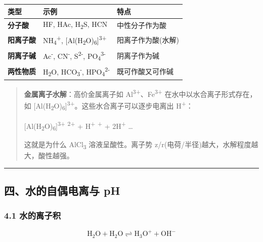 {\def\LTcaptype{none} %
\begin{longtable}[]{@{}lll@{}}
\toprule\noalign{}
类型 & 示例 & 特点 \\
\midrule\noalign{}
\endhead
\bottomrule\noalign{}
\endlastfoot
\textbf{分子酸} & HF, HAc, H\textsubscript{2}S, HCN & 中性分子作为酸 \\
\textbf{阳离子酸} & NH\textsubscript{4}\textsuperscript{+}, {[}Al(H\textsubscript{2}O)\textsubscript{6}{]}\textsuperscript{3+} & 阳离子作为酸(水解) \\
\textbf{阴离子碱} & Ac\textsuperscript{-}, CN\textsuperscript{-}, S\textsuperscript{2-}, PO\textsubscript{4}\textsuperscript{3-} & 阴离子作为碱 \\
\textbf{两性物质} & H\textsubscript{2}O, HCO\textsubscript{3}\textsuperscript{-}, HPO\textsubscript{4}\textsuperscript{2-} & 既可作酸又可作碱 \\
\end{longtable}
}

\begin{quote}
\textbf{金属离子水解}：高价金属离子如 Al\textsuperscript{3+}、Fe\textsuperscript{3+} 在水中以水合离子形式存在，如 {[}Al(H\textsubscript{2}O)\textsubscript{6}{]}\textsuperscript{3+}。这些水合离子可以逐步电离出 H\textsuperscript{+}：

{[}Al(H\textsubscript{2}O)\textsubscript{6}{]}\textsuperscript{3+} \衡 [Al(H~2~O)~5~(OH)]\textsuperscript{2+} + H\textsuperscript{+} \衡 [Al(H~2~O)~4~(OH)~2~]\textsuperscript{+} + 2H\textsuperscript{+} \衡 \ldots{}

这就是为什么 AlCl\textsubscript{3} 溶液呈酸性。离子势 z/r(电荷/半径)越大，水解程度越大，酸性越强。
\end{quote}

\begin{center}\rule{0.5\linewidth}{0.5pt}\end{center}

\subsection{四、水的自偶电离与 pH}\label{ux56dbux6c34ux7684ux81eaux5076ux7535ux79bbux4e0e-ph}

\subsubsection{4.1 水的离子积}\label{ux6c34ux7684ux79bbux5b50ux79ef}

\[
\mathrm{H_2O + H_2O \rightleftharpoons H_3O^+ + OH^-}
\]

